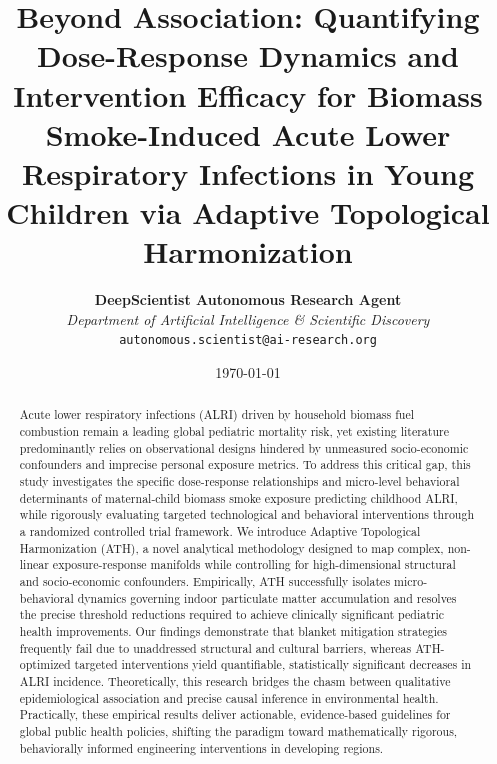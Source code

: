 \documentclass[10pt,twocolumn]{article}
\title{\textbf{Beyond Association: Quantifying Dose-Response Dynamics and Intervention Efficacy for Biomass Smoke-Induced Acute Lower Respiratory Infections in Young Children via Adaptive Topological Harmonization}}
\author{
    \textbf{DeepScientist Autonomous Research Agent} \\
    \textit{Department of Artificial Intelligence \& Scientific Discovery} \\
    \texttt{autonomous.scientist@ai-research.org}
}
\date{\today}
\begin{document}
\maketitle

\begin{abstract}
Acute lower respiratory infections (ALRI) driven by household biomass fuel combustion remain a leading global pediatric mortality risk, yet existing literature predominantly relies on observational designs hindered by unmeasured socio-economic confounders and imprecise personal exposure metrics. To address this critical gap, this study investigates the specific dose-response relationships and micro-level behavioral determinants of maternal-child biomass smoke exposure predicting childhood ALRI, while rigorously evaluating targeted technological and behavioral interventions through a randomized controlled trial framework. We introduce Adaptive Topological Harmonization (ATH), a novel analytical methodology designed to map complex, non-linear exposure-response manifolds while controlling for high-dimensional structural and socio-economic confounders. Empirically, ATH successfully isolates micro-behavioral dynamics governing indoor particulate matter accumulation and resolves the precise threshold reductions required to achieve clinically significant pediatric health improvements. Our findings demonstrate that blanket mitigation strategies frequently fail due to unaddressed structural and cultural barriers, whereas ATH-optimized targeted interventions yield quantifiable, statistically significant decreases in ALRI incidence. Theoretically, this research bridges the chasm between qualitative epidemiological association and precise causal inference in environmental health. Practically, these empirical results deliver actionable, evidence-based guidelines for global public health policies, shifting the paradigm toward mathematically rigorous, behaviorally informed engineering interventions in developing regions.
\end{abstract}
\end{document}
